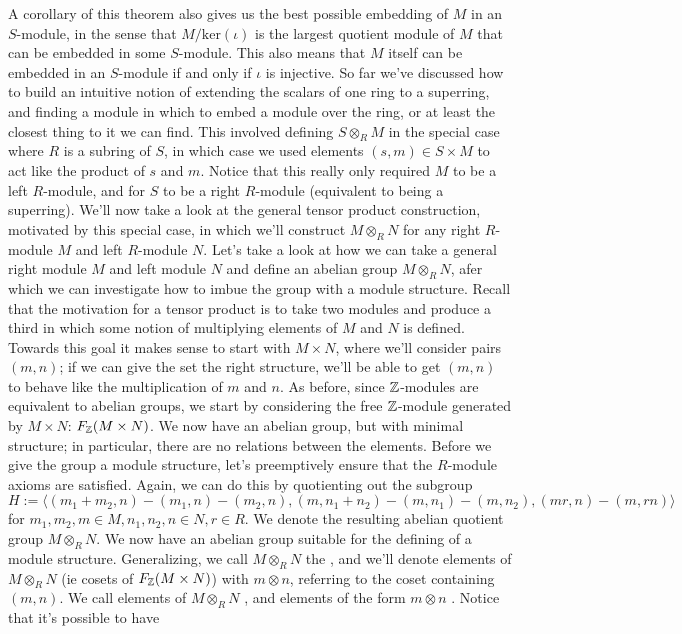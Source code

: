 \documentclass{article}
\begin{document}
\n
\Co A corollary of this theorem also gives us the best possible embedding of $ M $ in an $ S $-module, in the sense that $ M / \text{ker}(\iota) $ is the largest quotient module of $ M $ that can be embedded in some $ S $-module. This also means that $ M $ itself can be embedded in an $ S $-module if and only if $ \iota $ is injective.
\nn
So far we've discussed how to build an intuitive notion of extending the scalars of one ring to a superring, and finding a module in which to embed a module over the ring, or at least the closest thing to it we can find. This involved defining $ S \otimes_R M $ in the special case where $ R $ is a subring of $ S $, in which case we used elements $ (s, m) \in S \times M $ to act like the product of $ s $ and $ m $. Notice that this really only required $ M $ to be a left $ R $-module, and for $ S $ to be a right $ R $-module (equivalent to being a superring). We'll now take a look at the general tensor product construction, motivated by this special case, in which we'll construct $ M \otimes_R N $ for any right $ R $-module $ M $ and left $ R $-module $ N $.
\nn
Let's take a look at how we can take a general right module $ M $ and left module $ N $ and define an abelian group $ M \otimes_R N $, afer which we can investigate how to imbue the group with a module structure. Recall that the motivation for a tensor product is to take two modules and produce a third in which some notion of multiplying elements of $ M $ and $ N $ is defined. Towards this goal it makes sense to start with $ M \times N $, where we'll consider pairs $ (m, n) $; if we can give the set the right structure, we'll be able to get $ (m, n) $ to behave like the multiplication of $ m $ and $ n $. As before, since $ \mathbb{Z} $-modules are equivalent to abelian groups, we start by considering the free $ \mathbb{Z} $-module generated by $ M \times N $: $ F_{\mathbb{Z}}(M \times N) $. We now have an abelian group, but with minimal structure; in particular, there are no relations between the elements. Before we give the group a module structure, let's preemptively ensure that the $ R $-module axioms are satisfied. Again, we can do this by quotienting out the subgroup
$$ H := \big \langle (m_1 + m_2, n) - (m_1, n) - (m_2, n), (m, n_1 + n_2) - (m, n_1) - (m, n_2), (m r, n) - (m, r n) \big \rangle $$
for $ m_1, m_2, m \in M, n_1, n_2, n \in N, r \in R $. We denote the resulting abelian quotient group $ M \otimes_R N $.
\nn
We now have an abelian group suitable for the defining of a module structure. Generalizing, we call $ M \otimes_R N $ the , and we'll denote elements of $ M \otimes_R N $ (ie cosets of $ F_{\mathbb{Z}}(M \times N) $) with $ m \otimes n $, referring to the coset containing $ (m, n) $. We call elements of $ M \otimes_R N $ , and elements of the form $ m \otimes n $ . Notice that it's possible to have
\end{document}
